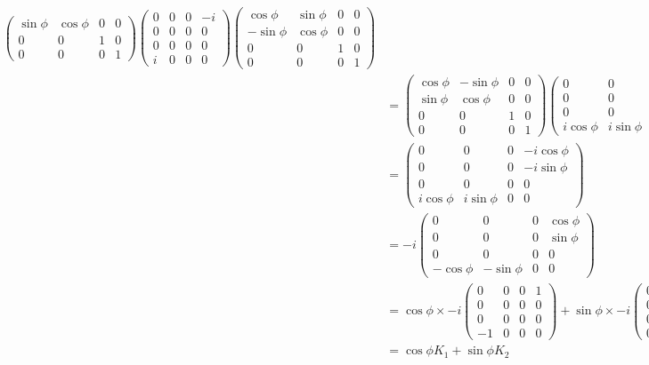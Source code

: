 \documentclass[../group-theory-in-a-nutshell-for-physicists.tex]{subfiles}
\begin{document}
\begin{questions}
\begin{solution}
\begin{align*}
\begin{pmatrix}
		\sin\phi & \cos\phi & 0 & 0 \\
		0 & 0 & 1 & 0 \\
		0 & 0 & 0 & 1
		\end{pmatrix}
		\begin{pmatrix}
		0 & 0 & 0 & -i \\
		0 & 0 & 0 & 0 \\
		0 & 0 & 0 & 0 \\
		i & 0 & 0 & 0
		\end{pmatrix}
		\begin{pmatrix}
		\cos\phi & \sin\phi & 0 & 0 \\
		-\sin\phi & \cos\phi & 0 & 0 \\
		0 & 0 & 1 & 0 \\
		0 & 0 & 0 & 1
		\end{pmatrix} \\
		&= \begin{pmatrix}
		\cos\phi & -\sin\phi & 0 & 0 \\
		\sin\phi & \cos\phi & 0 & 0 \\
		0 & 0 & 1 & 0 \\
		0 & 0 & 0 & 1
		\end{pmatrix}
		\begin{pmatrix}
		0 & 0 & 0 & -i \\
		0 & 0 & 0 & 0 \\
		0 & 0 & 0 & 0 \\
		i\cos\phi & i\sin\phi & 0 & 0
		\end{pmatrix} \\
		&= \begin{pmatrix}
		0 & 0 & 0 & -i\cos\phi \\
		0 & 0 & 0 & -i\sin\phi \\
		0 & 0 & 0 & 0 \\
		i\cos\phi & i\sin\phi & 0 & 0 
		\end{pmatrix} \\
		&= -i\begin{pmatrix}
		0 & 0 & 0 & \cos\phi \\
		0 & 0 & 0 & \sin\phi \\
		0 & 0 & 0 & 0 \\
		-\cos\phi & -\sin\phi & 0 & 0 
		\end{pmatrix} \\
		&= \cos\phi \times -i\begin{pmatrix}
		0 & 0 & 0 & 1 \\
		0 & 0 & 0 & 0 \\
		0 & 0 & 0 & 0 \\
		-1 & 0 & 0 & 0 
		\end{pmatrix} + \sin\phi \times -i\begin{pmatrix}
			0 & 0 & 0 & 0 \\
			0 & 0 & 0 & 1 \\
			0 & 0 & 0 & 0 \\
			0 & -1 & 0 & 0
		\end{pmatrix} \\
		&= \cos\phi K_1 + \sin\phi K_2
	\end{align*}
\end{solution}

\end{questions}
\end{document}
